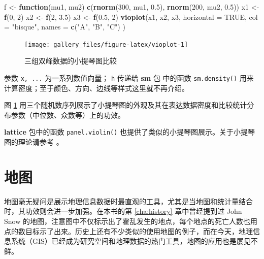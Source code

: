 \documentclass[
  b5paper,
  UTF8,twoside]{book}
\newenvironment{Shaded}{\begin{snugshade}}{\end{snugshade}}
\newcommand{\AttributeTok}[1]{\textcolor[rgb]{0.13,0.29,0.53}{#1}}
\newcommand{\ConstantTok}[1]{\textcolor[rgb]{0.56,0.35,0.01}{#1}}
\newcommand{\ControlFlowTok}[1]{\textcolor[rgb]{0.13,0.29,0.53}{\textbf{#1}}}
\newcommand{\DecValTok}[1]{\textcolor[rgb]{0.00,0.00,0.81}{#1}}
\newcommand{\FloatTok}[1]{\textcolor[rgb]{0.00,0.00,0.81}{#1}}
\newcommand{\FunctionTok}[1]{\textcolor[rgb]{0.13,0.29,0.53}{\textbf{#1}}}
\newcommand{\NormalTok}[1]{#1}
\newcommand{\OtherTok}[1]{\textcolor[rgb]{0.56,0.35,0.01}{#1}}
\newcommand{\StringTok}[1]{\textcolor[rgb]{0.31,0.60,0.02}{#1}}
\begin{document}
\begin{Shaded}
\begin{Highlighting}[]
\NormalTok{f }\OtherTok{\textless{}{-}} \ControlFlowTok{function}\NormalTok{(mu1, mu2)}
  \FunctionTok{c}\NormalTok{(}\FunctionTok{rnorm}\NormalTok{(}\DecValTok{300}\NormalTok{, mu1, }\FloatTok{0.5}\NormalTok{), }\FunctionTok{rnorm}\NormalTok{(}\DecValTok{200}\NormalTok{, mu2, }\FloatTok{0.5}\NormalTok{))}
\NormalTok{x1 }\OtherTok{\textless{}{-}} \FunctionTok{f}\NormalTok{(}\DecValTok{0}\NormalTok{, }\DecValTok{2}\NormalTok{)}
\NormalTok{x2 }\OtherTok{\textless{}{-}} \FunctionTok{f}\NormalTok{(}\DecValTok{2}\NormalTok{, }\FloatTok{3.5}\NormalTok{)}
\NormalTok{x3 }\OtherTok{\textless{}{-}} \FunctionTok{f}\NormalTok{(}\FloatTok{0.5}\NormalTok{, }\DecValTok{2}\NormalTok{)}
\FunctionTok{vioplot}\NormalTok{(x1, x2, x3,}
  \AttributeTok{horizontal =} \ConstantTok{TRUE}\NormalTok{, }\AttributeTok{col =} \StringTok{"bisque"}\NormalTok{,}
  \AttributeTok{names =} \FunctionTok{c}\NormalTok{(}\StringTok{"A"}\NormalTok{, }\StringTok{"B"}\NormalTok{, }\StringTok{"C"}\NormalTok{)}
\NormalTok{)}
\end{Highlighting}
\end{Shaded}

\begin{figure}

{\centering \texttt{[image: gallery\_files/figure-latex/vioplot-1]} 

}

\caption[三组双峰数据的小提琴图比较]{三组双峰数据的小提琴图比较}\label{fig:vioplot}
\end{figure}

参数 \texttt{x,\ ...} 为一系列数值向量； \texttt{h} 传递给 \textbf{sm} 包 \citep{sm} 中的函数 \texttt{sm.density()} 用来计算密度；至于颜色、方向、边线等样式这里就不再介绍。

图 \ref{fig:vioplot}
用三个随机数序列展示了小提琴图的外观及其在表达数据密度和比较统计分布参数（中位数、众数等）上的功效。

\textbf{lattice} 包中的函数 \texttt{panel.violin()} 也提供了类似的小提琴图展示。关于小提琴图的理论请参考 \citet{Hintze98}。

\section{地图}\label{sec:maps}

地图毫无疑问是展示地理信息数据时最直观的工具，尤其是当地图和统计量结合时，其功效则会进一步加强。在本书的第 \ref{cha:history} 章中曾经提到过 John Snow 的地图，注意图中不仅标示出了霍乱发生的地点，每个地点的死亡人数也用点的数目标示了出来。历史上还有不少类似的使用地图的例子，而在今天，地理信息系统（GIS）已经成为研究空间和地理数据的热门工具，地图的应用也是屡见不鲜。
\end{document}
